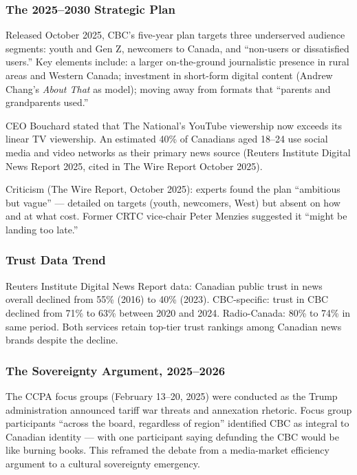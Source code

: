 \documentclass[11pt,letterpaper]{article}
\begin{document}
\subsubsection{The 2025--2030 Strategic Plan}

Released October 2025, CBC's five-year plan targets three underserved audience segments: youth and Gen Z, newcomers to Canada, and ``non-users or dissatisfied users.'' Key elements include: a larger on-the-ground journalistic presence in rural areas and Western Canada; investment in short-form digital content (Andrew Chang's \emph{About That} as model); moving away from formats that ``parents and grandparents used.''

CEO Bouchard stated that The National's YouTube viewership now exceeds its linear TV viewership. An estimated 40\% of Canadians aged 18--24 use social media and video networks as their primary news source (Reuters Institute Digital News Report 2025, cited in The Wire Report October 2025).

Criticism (The Wire Report, October 2025): experts found the plan ``ambitious but vague'' --- detailed on targets (youth, newcomers, West) but absent on how and at what cost. Former CRTC vice-chair Peter Menzies suggested it ``might be landing too late.''

\subsubsection{Trust Data Trend}

Reuters Institute Digital News Report data: Canadian public trust in news overall declined from 55\% (2016) to 40\% (2023). CBC-specific: trust in CBC declined from 71\% to 63\% between 2020 and 2024. Radio-Canada: 80\% to 74\% in same period. Both services retain top-tier trust rankings among Canadian news brands despite the decline.

\subsubsection{The Sovereignty Argument, 2025--2026}

The CCPA focus groups (February 13--20, 2025) were conducted as the Trump administration announced tariff war threats and annexation rhetoric. Focus group participants ``across the board, regardless of region'' identified CBC as integral to Canadian identity --- with one participant saying defunding the CBC would be like burning books. This reframed the debate from a media-market efficiency argument to a cultural sovereignty emergency.
\end{document}
